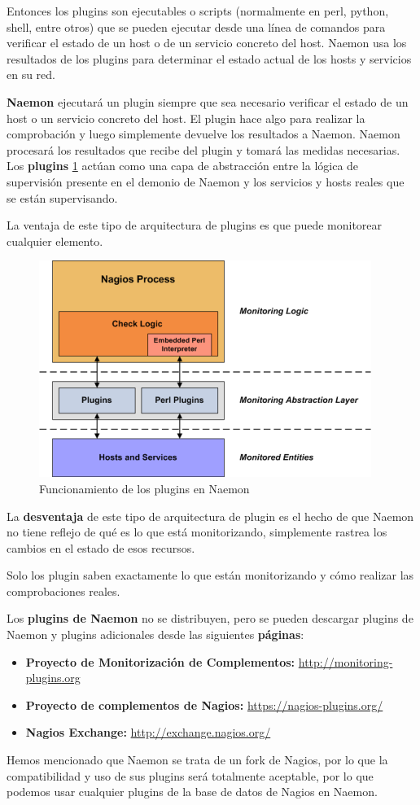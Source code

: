 Entonces los plugins son ejecutables o scripts (normalmente en perl, python, shell, entre otros) que se pueden ejecutar desde una línea de comandos para verificar el estado de un host o de un servicio concreto del host. Naemon usa los resultados de los plugins para determinar el estado actual de los hosts y servicios en su red. \cite{NaemonPlugins}

\textbf{Naemon} ejecutará un plugin siempre que sea necesario verificar el estado de un host o un servicio concreto del host. El plugin hace algo para realizar la comprobación y luego simplemente devuelve los resultados a Naemon. Naemon procesará los resultados que recibe del plugin y tomará las medidas necesarias.
\newpage
Los \textbf{plugins} \ref{plugin} actúan como una capa de abstracción entre la lógica de supervisión presente en el demonio de Naemon y los servicios y hosts reales que se están supervisando.

La ventaja de este tipo de arquitectura de plugins es que puede monitorear cualquier elemento.

\begin{figure}[H]
	\centering
	\includegraphics[scale=0.7]{imagenes/main_configuring/plugins.png}
	\caption{Funcionamiento de los plugins en Naemon} \label{plugin}	
\end{figure}

La \textbf{desventaja} de este tipo de arquitectura de plugin es el hecho de que Naemon no tiene reflejo de qué es lo que está monitorizando, simplemente rastrea los cambios en el estado de esos recursos.

Solo los plugin saben exactamente lo que están monitorizando y cómo realizar las comprobaciones reales.

Los \textbf{plugins de Naemon} no se distribuyen, pero se pueden descargar plugins de Naemon y plugins adicionales desde las siguientes \textbf{páginas}:
\begin{itemize}
	\item \textbf{Proyecto de Monitorización de Complementos: } \url{http://monitoring-plugins.org} 
	\item \textbf{Proyecto de complementos de Nagios: } \url{https://nagios-plugins.org/} 
	\item\textbf{ Nagios Exchange: } \url{http://exchange.nagios.org/}
\end{itemize}
\newpage
Hemos mencionado que Naemon se trata de un fork de Nagios, por lo que la compatibilidad y uso de sus plugins será totalmente aceptable, por lo que podemos usar cualquier plugins de la base de datos de Nagios en Naemon.